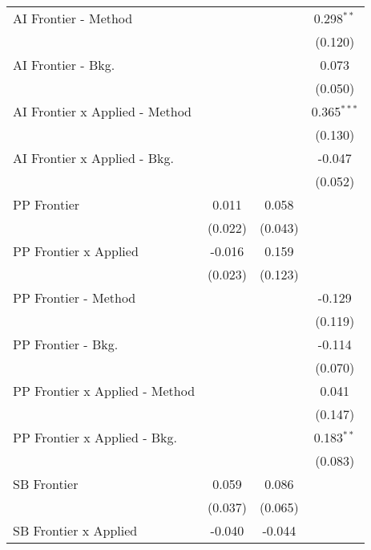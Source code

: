 \begin{tabular}{lccc}
   AI Frontier - Method           &              &              & 0.298$^{**}$\\   
                                  &              &              & (0.120)\\   
   AI Frontier - Bkg.             &              &              & 0.073\\   
                                  &              &              & (0.050)\\   
   AI Frontier x Applied - Method &              &              & 0.365$^{***}$\\   
                                  &              &              & (0.130)\\   
   AI Frontier x Applied - Bkg.   &              &              & -0.047\\   
                                  &              &              & (0.052)\\   
   PP Frontier                    & 0.011        & 0.058        &   \\   
                                  & (0.022)      & (0.043)      &   \\   
   PP Frontier x Applied          & -0.016       & 0.159        &   \\   
                                  & (0.023)      & (0.123)      &   \\   
   PP Frontier - Method           &              &              & -0.129\\   
                                  &              &              & (0.119)\\   
   PP Frontier - Bkg.             &              &              & -0.114\\   
                                  &              &              & (0.070)\\   
   PP Frontier x Applied - Method &              &              & 0.041\\   
                                  &              &              & (0.147)\\   
   PP Frontier x Applied - Bkg.   &              &              & 0.183$^{**}$\\   
                                  &              &              & (0.083)\\   
   SB Frontier                    & 0.059        & 0.086        &   \\   
                                  & (0.037)      & (0.065)      &   \\   
   SB Frontier x Applied          & -0.040       & -0.044       &   \\   

\end{tabular}

